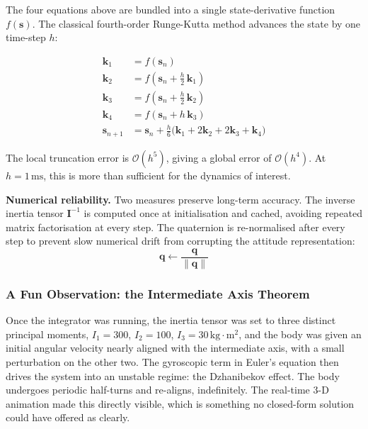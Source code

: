 \documentclass[11pt,a4paper]{article}
\begin{document}
The four equations above are bundled into a single state-derivative function $f(\mathbf{s})$. The classical fourth-order Runge-Kutta method advances the state by one time-step $h$:

\[
\begin{aligned}
\mathbf{k}_1 &= f(\mathbf{s}_n) \\
\mathbf{k}_2 &= f\!\left(\mathbf{s}_n + \tfrac{h}{2}\,\mathbf{k}_1\right) \\
\mathbf{k}_3 &= f\!\left(\mathbf{s}_n + \tfrac{h}{2}\,\mathbf{k}_2\right) \\
\mathbf{k}_4 &= f\!\left(\mathbf{s}_n + h\,\mathbf{k}_3\right) \\[6pt]
\mathbf{s}_{n+1} &= \mathbf{s}_n + \frac{h}{6}\bigl(\mathbf{k}_1 + 2\mathbf{k}_2 + 2\mathbf{k}_3 + \mathbf{k}_4\bigr)
\end{aligned}
\]

The local truncation error is $\mathcal{O}(h^5)$, giving a global error of $\mathcal{O}(h^4)$. At $h = 1\,\text{ms}$, this is more than sufficient for the dynamics of interest.

\textbf{Numerical reliability.} Two measures preserve long-term accuracy. The inverse inertia tensor $\mathbf{I}^{-1}$ is computed once at initialisation and cached, avoiding repeated matrix factorisation at every step. The quaternion is re-normalised after every step to prevent slow numerical drift from corrupting the attitude representation:
\[
\mathbf{q} \leftarrow \frac{\mathbf{q}}{\|\mathbf{q}\|}
\]

\subsubsection{A Fun Observation: the Intermediate Axis Theorem}

Once the integrator was running, the inertia tensor was set to three distinct principal moments, $I_1 = 300$, $I_2 = 100$, $I_3 = 30\,\text{kg}\cdot\text{m}^2$, and the body was given an initial angular velocity nearly aligned with the intermediate axis, with a small perturbation on the other two. The gyroscopic term in Euler's equation then drives the system into an unstable regime: the Dzhanibekov effect. The body undergoes periodic half-turns and re-aligns, indefinitely. The real-time 3-D animation made this directly visible, which is something no closed-form solution could have offered as clearly.

%
\end{document}
